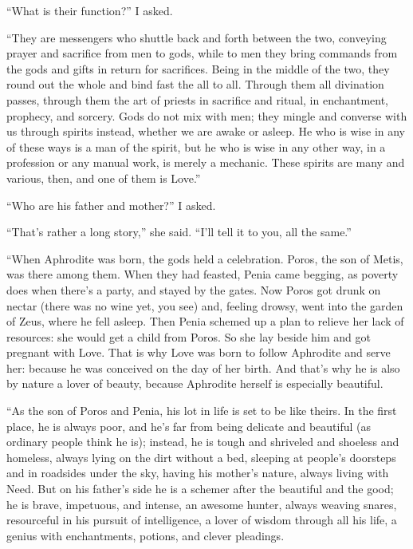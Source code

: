 “What is their function?” I asked.

“They are messengers who shuttle back and forth between the two,
conveying prayer and sacrifice from men to gods, while to men they bring
commands from the gods and gifts in return for sacrifices. Being in the
middle of the two, they round out the whole and bind fast the all to
all.  Through them all divination passes, through them
the art of priests in sacrifice and ritual, in enchantment, prophecy,
and sorcery. Gods do not mix with men; they mingle and converse with us
through spirits instead, whether we are awake or asleep. He who is wise
in any of these ways is a man of the spirit, but he who is wise in any
other way, in a profession or any manual work, is merely a mechanic.
These spirits are many and various, then, and one of them is Love.”

 “Who are his father and mother?” I asked.

“That’s rather a long story,” she said. “I’ll tell it to you, all the
same.”

“When Aphrodite was born, the gods held a celebration. Poros, the son of
Metis, was there among
them. When they had
feasted, Penia came begging, as poverty does when there’s a party, and
stayed by the gates. Now Poros got drunk on nectar (there was no wine
yet, you see) and, feeling drowsy, went into the garden of Zeus, where
he fell asleep. Then  Penia schemed up a plan to relieve her lack
of resources: she would get a child from Poros. So she lay beside him
and got pregnant with Love. That is why Love was born to follow
Aphrodite and serve her: because he was conceived on the day of her
birth. And that’s why he is also by nature a lover of beauty, because
Aphrodite herself is especially beautiful.

“As the son of Poros and Penia, his lot in life is set to be like
theirs. In the first place, he is always poor, and he’s far from being
delicate and  beautiful (as ordinary people think he is);
instead, he is tough and shriveled and shoeless and homeless, always
lying on the dirt without a bed, sleeping at people’s doorsteps and in
roadsides under the sky, having his mother’s nature, always living with
Need. But on his father’s side he is a schemer after the beautiful and
the good; he is brave, impetuous, and intense, an awesome hunter, always
weaving snares, resourceful in his pursuit of intelligence, a lover of
wisdom through all
his life, a genius with enchantments, potions, and clever pleadings.

